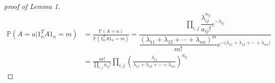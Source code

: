 \documentclass[twoside,11pt]{article}
\begin{document}
%
%
%
%
%
%

\begin{proof}[proof of Lemma 1]
\begin{align*}
\mathbb{P}(A=a|1_n^T A 1_n = m) &= \frac{\mathbb{P}(A=a)}{\mathbb{P}(1_n^T A 1_n = m)}
 = \dfrac{\prod_{i,j} \dfrac{\lambda_{ij}^{a_{ij}}}{a_{ij}!}e^{-\lambda_{ij}}}{\dfrac{(\lambda_{11} + \lambda_{12}+\cdots +\lambda_{nn})^m}{m!}e^{-({\lambda_{11} + \lambda_{12}+\cdots +\lambda_{nn})}}}\\
& = \frac{m!}{\prod_{i,j}a_{ij}!} \prod_{i,j} \left(\frac{\lambda_{ij}}{\lambda_{11} + \lambda_{12}+\cdots +\lambda_{nn}} \right)^{a_{ij}}
\end{align*}
\end{proof}


\vskip 0.2in
%
\end{document}
